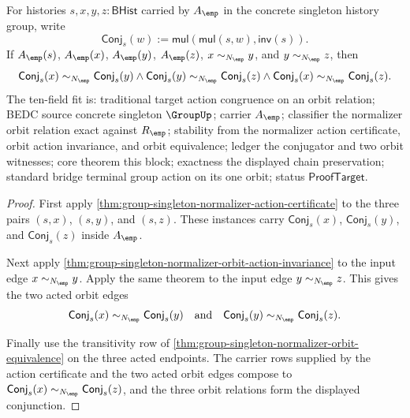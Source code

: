 \begin{theorem}
\label{thm:group-singleton-normalizer-orbit-action-chain}
For histories $s,x,y,z:\mathsf{BHist}$ carried by $A_{\emp}$ in the concrete
singleton history group, write
$$
\mathsf{Conj}_s(w):=\mathsf{mul}(\mathsf{mul}(s,w),\mathsf{inv}(s)).
$$
If $A_{\emp}(s)$, $A_{\emp}(x)$, $A_{\emp}(y)$, $A_{\emp}(z)$,
$x\sim_{N_{\emp}}y$, and $y\sim_{N_{\emp}}z$, then
$$
\mathsf{Conj}_s(x)\sim_{N_{\emp}}\mathsf{Conj}_s(y)
\land
\mathsf{Conj}_s(y)\sim_{N_{\emp}}\mathsf{Conj}_s(z)
\land
\mathsf{Conj}_s(x)\sim_{N_{\emp}}\mathsf{Conj}_s(z).
$$
The ten-field fit is: traditional target action congruence on an orbit
relation; BEDC source concrete singleton $\GroupUp$; carrier $A_{\emp}$;
classifier the normalizer orbit relation exact against $R_{\emp}$; stability
from the normalizer action certificate, orbit action invariance, and orbit
equivalence; ledger the conjugator and two orbit witnesses; core theorem this
block; exactness the displayed chain preservation; standard bridge terminal
group action on its one orbit; status $\mathsf{ProofTarget}$.
\end{theorem}
\begin{proof}
First apply
\autoref{thm:group-singleton-normalizer-action-certificate} to the three pairs
$(s,x)$, $(s,y)$, and $(s,z)$. These instances carry
$\mathsf{Conj}_s(x)$, $\mathsf{Conj}_s(y)$, and $\mathsf{Conj}_s(z)$ inside
$A_{\emp}$.

Next apply
\autoref{thm:group-singleton-normalizer-orbit-action-invariance} to the input
edge $x\sim_{N_{\emp}}y$. Apply the same theorem to the input edge
$y\sim_{N_{\emp}}z$. This gives the two acted orbit edges
$$
\mathsf{Conj}_s(x)\sim_{N_{\emp}}\mathsf{Conj}_s(y)
\quad\text{and}\quad
\mathsf{Conj}_s(y)\sim_{N_{\emp}}\mathsf{Conj}_s(z).
$$

Finally use the transitivity row of
\autoref{thm:group-singleton-normalizer-orbit-equivalence} on the three acted
endpoints. The carrier rows supplied by the action certificate and the two
acted orbit edges compose to
$\mathsf{Conj}_s(x)\sim_{N_{\emp}}\mathsf{Conj}_s(z)$, and the three orbit
relations form the displayed conjunction.
\end{proof}

